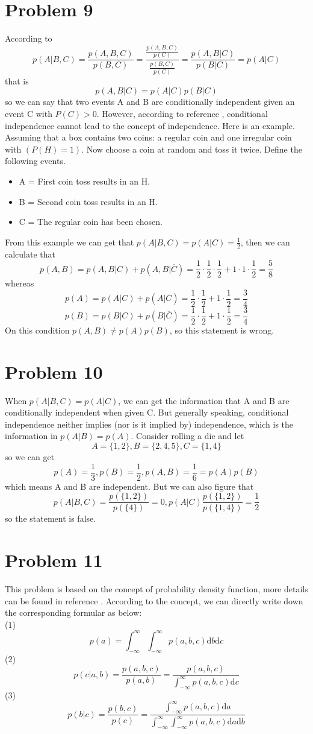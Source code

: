 \documentclass{article}
\begin{document}
\section*{Problem 9}
According to \[p(A|B,C)=\frac{p(A,B,C)}{p(B,C)}=\frac{\frac{p(A,B,C)}{p(C)}}{\frac{p(B,C)}{p(C)}} = \frac{p(A,B|C)}{p(B|C)} = p(A|C) \]
that is 
\[ p(A,B|C) = p(A|C)p(B|C)\]
so we can say that two events A and B are conditionally independent given an event C with $P(C)>0$. However, according to reference \cite{CI}, conditional independence cannot lead to the concept of independence.
Here is an example. Assuming that a box contains two coins: a regular coin and one irregular coin with $(P(H)=1)$. Now choose a coin at random and toss it twice. Define the following events.
\begin{itemize}
	\item A = First coin toss results in an H.
	\item B = Second coin toss results in an H.
	\item C = The regular coin has been chosen.
\end{itemize}
From this example we can get that $p(A|B,C)=p(A|C)=\frac{1}{2}$, then we can calculate that
\[ p(A,B) = p(A,B|C)+p(A,B|\overline{C})=\frac{1}{2} \cdot \frac{1}{2} \cdot \frac{1}{2}+1 \cdot 1 \cdot \frac{1}{2} =\frac{5}{8} \]
whereas
\[ p(A) = p(A|C)+p(A|\overline{C}) = \frac{1}{2} \cdot \frac{1}{2} + 1 \cdot \frac{1}{2} = \frac{3}{4} \]
\[ p(B) = p(B|C)+p(B|\overline{C}) = \frac{1}{2} \cdot \frac{1}{2} + 1 \cdot \frac{1}{2} = \frac{3}{4}\]
On this condition $ p(A,B) \not= p(A)p(B)$, so this statement is wrong.
\section*{Problem 10}
When $p(A|B,C) = p(A|C)$, we can get the information that A and B are conditionally independent when given C. But generally speaking, conditional independence neither implies (nor is it implied by) independence, which is the information in $p(A|B) = p(A)$.
Consider rolling a die and let \[ A=\{1,2\}, B=\{2,4,5\},C=\{1,4\}\]
so we can get \[p(A) = \frac{1}{3},p(B) = \frac{1}{2},p(A,B) = \frac{1}{6} = p(A)p(B)\]
which means A and B are independent. But we can also figure that
\[ p(A|B,C) = \frac{p(\{1,2\})}{p(\{4\})} = 0, p(A|C) \frac{p(\{1,2\})}{p(\{1,4\})}= \frac{1}{2}\]
so the statement is false.

\section*{Problem 11}
This problem is based on the concept of probability density function, more details can be found in reference \cite{cs229-prob}. According to the concept, we can directly write down the corresponding formular as below:\\
(1)  \[p(a) = \int_{-\infty}^{\infty}\int_{-\infty}^{\infty}p(a,b,c)\mathrm{d}b\mathrm{d}c\]
(2) \[p(c|a,b) = \frac{p(a,b,c)}{p(a,b)} = \frac{p(a,b,c)}{\int_{-\infty}^{\infty}p(a,b,c)\mathrm{d}c}\]
(3)\[p(b|c) = \frac{p(b,c)}{p(c)}=\frac{\int_{-\infty}^{\infty}p(a,b,c)\mathrm{d}a}{\int_{-\infty}^{\infty}\int_{-\infty}^{\infty}p(a,b,c)\mathrm{d}a\mathrm{d}b}\]
\end{document}
